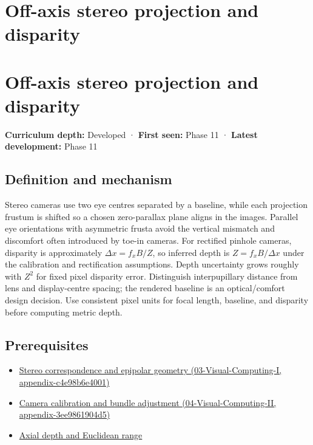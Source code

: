 \hypertarget{appendix-0976e86e5b9f}{}
\section*{Off-axis stereo projection and disparity}
\section{Off-axis stereo projection and disparity}\label{off-axis-stereo-projection-and-disparity}

\textbf{Curriculum depth:} Developed · \textbf{First seen:} Phase 11 · \textbf{Latest development:} Phase 11

\subsection{Definition and mechanism}\label{definition-and-mechanism}

Stereo cameras use two eye centres separated by a baseline, while each projection frustum is shifted so a chosen zero-parallax plane aligns in the images. Parallel eye orientations with asymmetric frusta avoid the vertical mismatch and discomfort often introduced by toe-in cameras. For rectified pinhole cameras, disparity is approximately \(\Delta x=f_xB/Z\), so inferred depth is \(Z=f_xB/\Delta x\) under the calibration and rectification assumptions. Depth uncertainty grows roughly with \(Z^2\) for fixed pixel disparity error. Distinguish interpupillary distance from lens and display-centre spacing; the rendered baseline is an optical/comfort design decision. Use consistent pixel units for focal length, baseline, and disparity before computing metric depth.

\subsection{Prerequisites}\label{prerequisites}

\begin{itemize}
\tightlist
\item
  \href{}{Stereo correspondence and epipolar geometry (03-Visual-Computing-I, appendix-c4e98b6e4001)}
\item
  \href{}{Camera calibration and bundle adjustment (04-Visual-Computing-II, appendix-3ee9861904d5)}
\item
  \hyperref[appendix-cac01ebeeb11]{Axial depth and Euclidean range}
\end{itemize}

